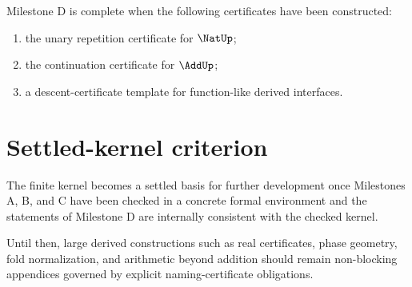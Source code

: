 \begin{protocol}[Milestone D]
Milestone D is complete when the following certificates have been constructed:
\begin{enumerate}
  \item the unary repetition certificate for \(\NatUp\);
  \item the continuation certificate for \(\AddUp\);
  \item a descent-certificate template for function-like derived interfaces.
\end{enumerate}
\end{protocol}

\section{Settled-kernel criterion}

\begin{definition}
\label{def:settled-kernel-criterion}
The finite kernel becomes a settled basis for further development once Milestones A, B, and C have been checked in a concrete formal environment and the statements of Milestone D are internally consistent with the checked kernel.
\end{definition}

\begin{remark}
Until then, large derived constructions such as real certificates, phase geometry, fold normalization, and arithmetic beyond addition should remain non-blocking appendices governed by explicit naming-certificate obligations.
\end{remark}
